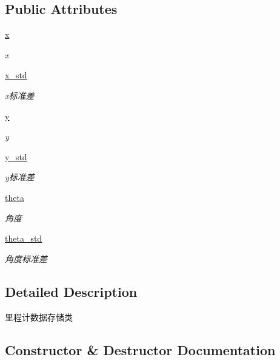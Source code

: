 \subsection*{Public Attributes}
\begin{DoxyCompactItemize}
\item 
\hyperlink{classselect___a__dox_1_1_odom__unit_ae48196e11b6528df6968b016cafbe3af}{x}
\begin{DoxyCompactList}\small\item\em x \end{DoxyCompactList}\item 
\hyperlink{classselect___a__dox_1_1_odom__unit_a17ed824dc140708d9394a796ca525d38}{x\+\_\+std}
\begin{DoxyCompactList}\small\item\em x标准差 \end{DoxyCompactList}\item 
\hyperlink{classselect___a__dox_1_1_odom__unit_ad541c5ad51695034973d0cdf5c1b6f2e}{y}
\begin{DoxyCompactList}\small\item\em y \end{DoxyCompactList}\item 
\hyperlink{classselect___a__dox_1_1_odom__unit_a5fc9b6033f85c19f60a6d7faddbf46d2}{y\+\_\+std}
\begin{DoxyCompactList}\small\item\em y标准差 \end{DoxyCompactList}\item 
\hyperlink{classselect___a__dox_1_1_odom__unit_a61441083f45a04659d2aa00d050d9026}{theta}
\begin{DoxyCompactList}\small\item\em 角度 \end{DoxyCompactList}\item 
\hyperlink{classselect___a__dox_1_1_odom__unit_af4b26cfc5620e927234f1163d4800cf1}{theta\+\_\+std}
\begin{DoxyCompactList}\small\item\em 角度标准差 \end{DoxyCompactList}\end{DoxyCompactItemize}


\subsection{Detailed Description}
里程计数据存储类 



\subsection{Constructor \& Destructor Documentation}
\mbox{\label{classselect___a__dox_1_1_odom__unit_a49c773e3b8285f9e34bd76650e467560}} 

